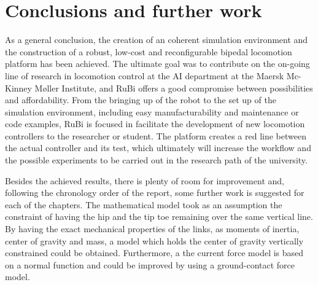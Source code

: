 \chapter{Conclusions and further work} %
\label{cha:conclusions}
As a general conclusion, the creation of an coherent simulation environment and the construction of a robust, low-cost and reconfigurable bipedal locomotion platform has been achieved.
The ultimate goal was to contribute on the on-going line of research in locomotion control at the AI department at the Maersk Mc-Kinney Møller Institute, and RuBi offers a good compromise between possibilities and affordability.
From the bringing up of the robot to the set up of the simulation environment,  including easy manufacturability and maintenance or code examples, RuBi is focused in facilitate the development of new locomotion controllers to the researcher or student.
The platform creates a red line between the actual controller and its test, which ultimately will increase the workflow and the possible experiments to be carried out in the research path of the university.




Besides the achieved results, there is plenty of room for improvement and, following the chronology order of the report, some further work is suggested for each of the chapters.
The mathematical model took as an assumption the constraint of having the hip and the tip toe remaining over the same vertical line.
By having the exact mechanical properties of the links, as moments of inertia, center of gravity and mass, a model which holds the center of gravity vertically constrained could be obtained.
Furthermore, a the current force model  is based on a normal function and could be improved by using a ground-contact force model.

